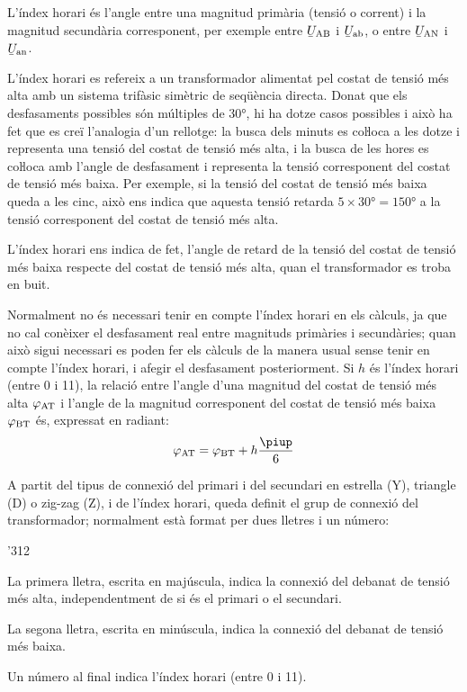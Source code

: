 L'índex horari és l'angle entre una magnitud  primària (tensió o corrent) i la magnitud secundària corresponent, per exemple entre $\cmplx{U}\ped{AB}$ i $\cmplx{U}\ped{ab}$, o entre $\cmplx{U}\ped{AN}$ i $\cmplx{U}\ped{an}$.

L'índex horari es refereix a un transformador alimentat pel costat de tensió més alta  amb un sistema trifàsic simètric de seqüència directa. Donat que els desfasaments possibles són múltiples de \ang{30}, hi ha dotze casos possibles i això ha fet que es creï l'analogia d'un rellotge: la busca dels minuts es coŀloca a les dotze i representa una tensió del costat de tensió més alta, i la busca de les hores es coŀloca amb l'angle de desfasament i representa la tensió corresponent del costat de tensió més baixa. Per exemple, si la tensió del costat de tensió més baixa queda a les cinc, això ens indica que aquesta tensió retarda $5\times \ang{30}= \ang{150}$ a la tensió corresponent del costat de tensió més alta.

L'índex horari ens indica de fet, l'angle de retard de la tensió del costat de tensió més baixa respecte del costat de tensió més alta, quan el transformador es troba en buit.

Normalment no és necessari tenir en compte l'índex horari en els càlculs, ja que no cal conèixer el desfasament real entre magnituds primàries i secundàries; quan això sigui necessari es poden fer els càlculs de la manera usual sense tenir en compte l'índex horari, i afegir el desfasament posteriorment. Si $h$ és l'índex horari (entre 0 i 11), la relació entre l'angle d'una magnitud del costat de tensió més alta $\varphi_\mathrm{AT}$ i l'angle de la magnitud corresponent del costat de tensió més baixa $\varphi_\mathrm{BT}$ és, expressat en radiant:
\begin{equation}
    \varphi\ped{AT} = \varphi\ped{BT} + h\frac{\piup}{6}\label{eq:fi-AT-BT}
\end{equation}


A partit del tipus de connexió del primari i del secundari en estrella (Y), triangle (D) o zig-zag (Z), i de l'índex horari, queda definit el grup de connexió del transformador; normalment està format per dues lletres i un número:
\begin{dingautolist}{'312}
   \item La primera lletra, escrita en majúscula, indica la connexió del debanat de tensió més alta, independentment de si és el primari o el secundari.
   \item La segona lletra, escrita en minúscula, indica la connexió del debanat de tensió més baixa.
   \item Un número al final indica l'índex horari (entre 0 i 11).
\end{dingautolist}

